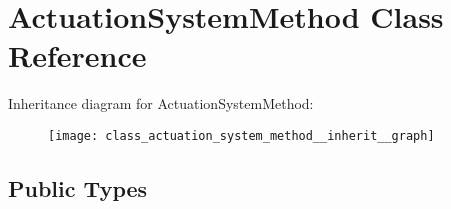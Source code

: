 \hypertarget{class_actuation_system_method}{\section{\-Actuation\-System\-Method \-Class \-Reference}
\label{class_actuation_system_method}
}


\-Inheritance diagram for \-Actuation\-System\-Method\-:\nopagebreak
\begin{figure}[H]
\begin{center}
\leavevmode
\texttt{[image: class\_actuation\_system\_method\_\_inherit\_\_graph]}
\end{center}
\end{figure}
\subsection*{\-Public \-Types}
